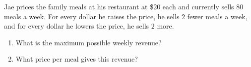 Jae prices the family meals at his restaurant at \$20 each and currently sells $80$ meals a week. For every dollar he raises the price, he sells $2$ fewer meals a week, and for every dollar he lowers the price, he sells $2$ more.
\begin{enumerate}
\item[(a)] What is the maximum possible weekly revenue?
\item[(b)] What price per meal gives this revenue?
\end{enumerate}
